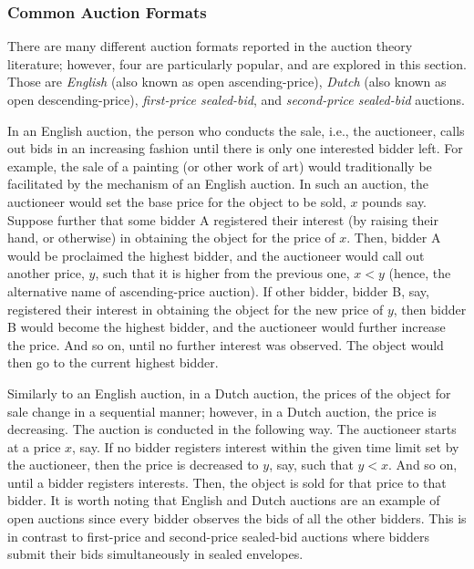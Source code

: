 \subsubsection{Common Auction Formats} %
\label{ssub:common_auction_formats_dmp}
There are many different auction formats reported in the auction theory literature; however, four are particularly popular, and are explored in this section. Those are \emph{English} (also known as open ascending-price), \emph{Dutch} (also known as open descending-price), \emph{first-price sealed-bid}, and \emph{second-price sealed-bid} auctions.

In an English auction, the person who conducts the sale, i.e., the auctioneer, calls out bids in an increasing fashion until there is only one interested bidder left. For example, the sale of a painting (or other work of art) would traditionally be facilitated by the mechanism of an English auction. In such an auction, the auctioneer would set the base price for the object to be sold, $x$ pounds say. Suppose further that some bidder A registered their interest (by raising their hand, or otherwise) in obtaining the object for the price of $x$. Then, bidder A would be proclaimed the highest bidder, and the auctioneer would call out another price, $y$, such that it is higher from the previous one, $x < y$ (hence, the alternative name of ascending-price auction). If other bidder, bidder B, say, registered their interest in obtaining the object for the new price of $y$, then bidder B would become the highest bidder, and the auctioneer would further increase the price. And so on, until no further interest was observed. The object would then go to the current highest bidder.

Similarly to an English auction, in a Dutch auction, the prices of the object for sale change in a sequential manner; however, in a Dutch auction, the price is decreasing. The auction is conducted in the following way. The auctioneer starts at a price $x$, say. If no bidder registers interest within the given time limit set by the auctioneer, then the price is decreased to $y$, say, such that $y < x$. And so on, until a bidder registers interests. Then, the object is sold for that price to that bidder. It is worth noting that English and Dutch auctions are an example of open auctions since every bidder observes the bids of all the other bidders. This is in contrast to first-price and second-price sealed-bid auctions where bidders submit their bids simultaneously in sealed envelopes.

